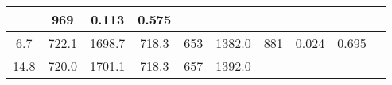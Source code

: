 \documentclass[a4paper,10pt]{article}
\begin{document}
\begin{longtable}{
     |
%    
    c|
%    
    c|
%    
    c|
%    
    c|
%    
    c|
%    
    c|
%    
    c|
%    
    c|
%    
    c|
%    
    c|
%    
    }
%        
        & 969
%        

%        

%        
        & 0.113
%        

%        

%        
        & 0.575
%        

%        
        \\
        \hline

        

%        

%        
        6.7
%        

%        

%        
        & 722.1
%        

%        

%        
        & 1698.7
%        

%        

%        
        & 718.3
%        

%        

%        
        & 653
%        

%        

%        
        & 1382.0
%        

%        

%        
        & 881
%        

%        

%        
        & 0.024
%        

%        

%        
        & 0.695
%        

%        
        \\
        \hline

        

%        

%        
        14.8
%        

%        

%        
        & 720.0
%        

%        

%        
        & 1701.1
%        

%        

%        
        & 718.3
%        

%        

%        
        & 657
%        

%        

%        
        & 1392.0
%        

%        


\end{longtable}
\end{document}
